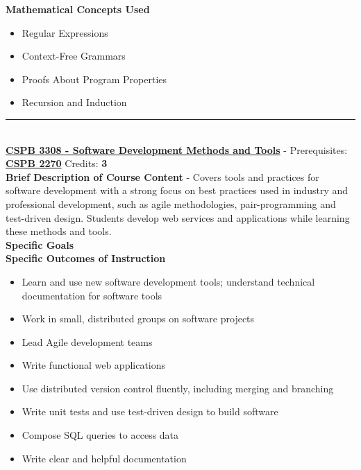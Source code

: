 \documentclass{article}
\newcommand{\horizontalline}{\noindent \rule{\textwidth}{0.5pt} \\}
\begin{document}
\noindent \textbf{Mathematical Concepts Used}
\begin{itemize}
    \item Regular Expressions
    \item Context-Free Grammars
    \item Proofs About Program Properties
    \item Recursion and Induction
\end{itemize}
\horizontalline
\noindent \href{https://www.colorado.edu/program/cspb/cspb-3308-software-development-methods-and-tools}{\textbf{CSPB 3308 - Software Development Methods and Tools}} - Prerequisites: \href{https://www.colorado.edu/program/cspb/cspb-2270-computer-science-2-data-structures}{\textbf{CSPB 2270}} Credits: \textbf{3} \\

\noindent \textbf{Brief Description of Course Content} - Covers tools and practices for software development with a strong focus on best practices used in industry and professional development, such as agile methodologies, pair-programming and test-driven design. Students develop web services and applications while learning these methods and tools. \\

\noindent \textbf{Specific Goals} \\

\noindent \textbf{Specific Outcomes of Instruction}
\begin{itemize}
    \item Learn and use new software development tools; understand technical documentation for software tools
    \item Work in small, distributed groups on software projects
    \item Lead Agile development teams
    \item Write functional web applications
    \item Use distributed version control fluently, including merging and branching
    \item Write unit tests and use test-driven design to build software
    \item Compose SQL queries to access data
    \item Write clear and helpful documentation
\end{itemize}
\end{document}
